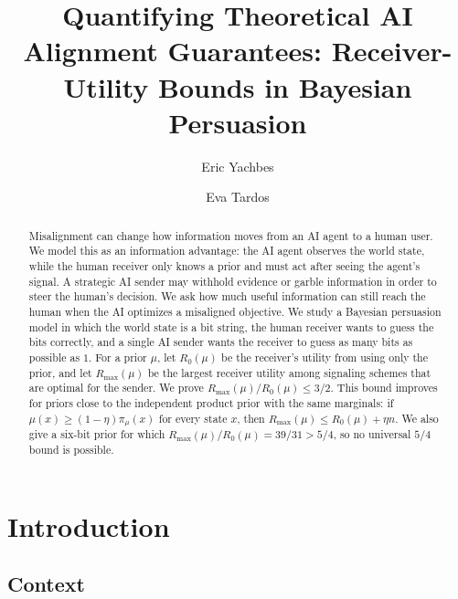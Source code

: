 \documentclass[format=acmsmall, review=false]{acmart}
\begin{document}
\title[Quantifying Theoretical AI Alignment Guarantees]{Quantifying Theoretical AI Alignment Guarantees: Receiver-Utility Bounds in Bayesian Persuasion}
\author{Eric Yachbes}
\author{Eva Tardos}

\begin{abstract}
Misalignment can change how information moves from an AI agent to a human user.
We model this as an information advantage: the AI agent observes the world
state, while the human receiver only knows a prior and must act after seeing the
agent's signal. A strategic AI sender may withhold evidence or garble
information in order to steer the human's decision. We ask how much useful
information can still reach the human when the AI optimizes a misaligned
objective. We study a Bayesian persuasion model in which the world state is a
bit string, the human receiver wants to guess the bits correctly, and a single
AI sender wants the receiver to guess as many bits as possible as $1$. For a
prior $\mu$, let $R_0(\mu)$ be the receiver's utility from using only the prior,
and let $R_{\max}(\mu)$ be the largest receiver utility among signaling schemes
that are optimal for the sender. We prove
$R_{\max}(\mu)/R_0(\mu)\leq 3/2$. This bound improves for priors close to the
independent product prior with the same marginals: if
$\mu(x)\geq (1-\eta)\pi_\mu(x)$ for every state $x$, then
$R_{\max}(\mu)\leq R_0(\mu)+\eta n$. We also give a six-bit prior for which
$R_{\max}(\mu)/R_0(\mu)=39/31>5/4$, so no universal $5/4$ bound is possible.
\end{abstract}

\maketitle

\vspace{1cm}
\setcounter{tocdepth}{2}
\tableofcontents

\clearpage

\section{Introduction}

\subsection{Context}
\end{document}
